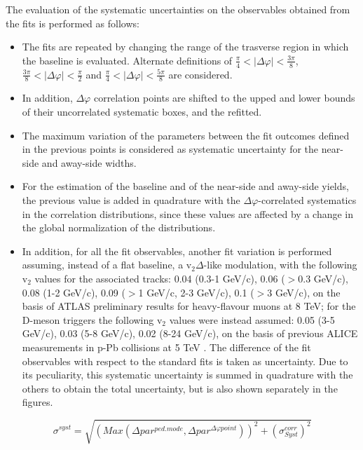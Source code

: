 The evaluation of the systematic uncertainties on the observables obtained from the fits is performed as follows:

\begin{itemize}
\item The fits are repeated by changing the range of the trasverse region in which the baseline is evaluated. Alternate definitions of $\frac{\pi}{4}<|\Delta\varphi|<\frac{3\pi}{8}$, $\frac{3\pi}{8}<|\Delta\varphi|<\frac{\pi}{2}$ and $\frac{\pi}{4}<|\Delta\varphi|<\frac{5\pi}{8}$ are considered.
\item In addition, $\Delta\varphi$ correlation points are shifted to the upped and lower bounds of their uncorrelated systematic boxes, and the refitted.
\item The maximum variation of the parameters between the fit outcomes defined in the previous points is considered as systematic uncertainty for the near-side and away-side widths.
\item For the estimation of the baseline and of the near-side and away-side yields, the previous value is added in quadrature with the $\Delta\varphi$-correlated systematics in the correlation distributions, since these values are affected by a change in the global normalization of the distributions.
\item In addition, for all the fit observables, another fit variation is performed assuming, instead of a flat baseline, a v$_2\Delta$-like modulation, with the following v$_2$ values for the associated tracks: 0.04 (0.3-1 GeV/c), 0.06 ($>$0.3 GeV/c), 0.08 (1-2 GeV/c), 0.09 ($>$1 GeV/c, 2-3 GeV/c), 0.1 ($>$3 GeV/c), on the basis of ATLAS preliminary results for heavy-flavour muons at 8 TeV; for the D-meson triggers the following v$_2$ values were instead assumed: 0.05 (3-5 GeV/c), 0.03 (5-8 GeV/c), 0.02 (8-24 GeV/c), on the basis of previous ALICE measurements in p-Pb collisions at 5 TeV \cite{ALICEv2ppb}. The difference of the fit observables with respect to the standard fits is taken as uncertainty. Due to its peculiarity, this systematic uncertainty is summed in quadrature with the others to obtain the total uncertainty, but is also shown separately in the figures.
\end{itemize}

\begin{equation}
\sigma^{syst} = \sqrt{\left(Max\left(\Delta par^{ped.mode},\Delta par^{\Delta\varphi point}\right)\right)^{2} + (\sigma_{Syst}^{corr})^{2}}
\end{equation}

